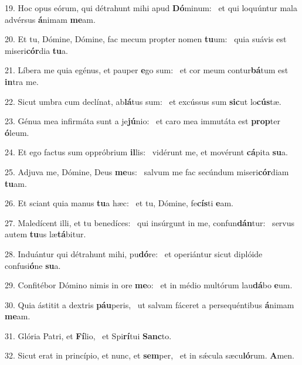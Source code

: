 19. Hoc opus eórum, qui détrahunt mihi apud \textbf{Dó}minum: \ast\  et qui loquúntur mala advérsus \textbf{á}nimam \textbf{me}am.\

20. Et tu, Dómine, Dómine, fac mecum propter nomen \textbf{tu}um: \ast\  quia suávis est miseri\textbf{cór}dia \textbf{tu}a.\

21. Líbera me quia egénus, et pauper \textbf{e}go sum: \ast\  et cor meum contur\textbf{bá}tum est \textbf{in}tra me.\

22. Sicut umbra cum declínat, ab\textbf{lá}tus sum: \ast\  et excússus sum \textbf{sic}ut lo\textbf{cús}tæ.\

23. Génua mea infirmáta sunt a je\textbf{jú}nio: \ast\  et caro mea immutáta est \textbf{prop}ter \textbf{ó}leum.\

24. Et ego factus sum oppróbrium \textbf{il}lis: \ast\  vidérunt me, et movérunt \textbf{cá}pita \textbf{su}a.\

25. Adjuva me, Dómine, Deus \textbf{me}us: \ast\  salvum me fac secúndum miseri\textbf{cór}diam \textbf{tu}am.\

26. Et sciant quia manus \textbf{tu}a hæc: \ast\  et tu, Dómine, fe\textbf{cís}ti \textbf{e}am.\

27. Maledícent illi, et tu benedíces: \dag\  qui insúrgunt in me, confun\textbf{dán}tur: \ast\  servus autem \textbf{tu}us læ\textbf{tá}bitur.\

28. Induántur qui détrahunt mihi, pu\textbf{dó}re: \ast\  et operiántur sicut diplóide confusi\textbf{ó}ne \textbf{su}a.\

29. Confitébor Dómino nimis in ore \textbf{me}o: \ast\  et in médio multórum lau\textbf{dá}bo \textbf{e}um.\

30. Quia ástitit a dextris \textbf{páu}peris, \ast\  ut salvam fáceret a persequéntibus \textbf{á}nimam \textbf{me}am.\

31. Glória Patri, et \textbf{Fí}lio, \ast\  et Spi\textbf{rí}tui \textbf{Sanc}to.\

32. Sicut erat in princípio, et nunc, et \textbf{sem}per, \ast\  et in sǽcula sæcu\textbf{ló}rum. \textbf{A}men.\

